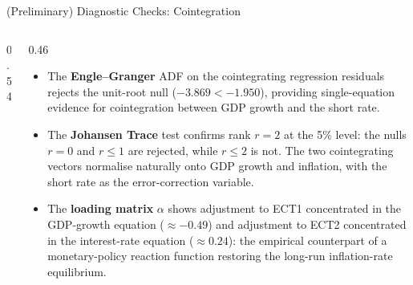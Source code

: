 \documentclass[9pt]{beamer}
\begin{document}
\begin{frame}{(Preliminary) Diagnostic Checks: Cointegration}
\footnotesize

\begin{columns}

  \begin{column}{0.54\textwidth}
    {\fontsize{5.5}{6}\selectfont
    \setlength{\tabcolsep}{2.5pt}
    \setlength{\abovecaptionskip}{2pt}
    \setlength{\belowcaptionskip}{1pt}
    
    \vspace{0.1cm}
    
    \vspace{0.1cm}
    
    }
  \end{column}

  \begin{column}{0.46\textwidth}
    \footnotesize
    \begin{itemize}
      \item The \textbf{Engle--Granger} ADF on the cointegrating regression residuals rejects the unit-root null ($-3.869 < -1.950$), providing single-equation evidence for cointegration between GDP growth and the short rate.

      \item The \textbf{Johansen Trace} test confirms rank $r=2$ at the 5\% level: the nulls $r=0$ and $r \leq 1$ are rejected, while $r \leq 2$ is not. The two cointegrating vectors normalise naturally onto GDP growth and inflation, with the short rate as the error-correction variable.

      \item The \textbf{loading matrix} $\alpha$ shows adjustment to ECT1 concentrated in the GDP-growth equation ($\approx -0.49$) and adjustment to ECT2 concentrated in the interest-rate equation ($\approx 0.24$): the empirical counterpart of a monetary-policy reaction function restoring the long-run inflation-rate equilibrium.
    \end{itemize}
  \end{column}

\end{columns}

\end{frame}


\end{document}
